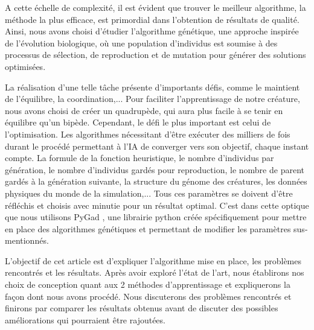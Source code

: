 \documentclass[journal, a4paper]{IEEEtran}
\begin{document}
A cette échelle de complexité, il est évident que trouver le meilleur algorithme, la méthode la plus efficace, est primordial dans l'obtention de résultats de qualité. Ainsi, nous avons choisi d'étudier l'algorithme génétique, une approche inspirée de l'évolution biologique, où une population d'individus est soumise à des processus de sélection, de reproduction et de mutation pour générer des solutions optimisées.

La réalisation d'une telle tâche présente d'importants défis, comme le maintient de l'équilibre, la coordination,... Pour faciliter l'apprentissage de notre créature, nous avons choisi de créer un quadrupède, qui aura plus facile à se tenir en équilibre qu'un bipède.
Cependant, le défi le plus important est celui de l'optimisation. Les algorithmes nécessitant d'être exécuter des milliers de fois durant le procédé permettant à l'IA de converger vers son objectif, chaque instant compte. La formule de la fonction heuristique, le nombre d'individus par génération, le nombre d'individus gardés pour reproduction, le nombre de parent gardés à la génération suivante, la structure du génome des créatures, les données physiques du monde de la simulation,... Tous ces paramètres se doivent d'être réfléchis et choisis avec minutie pour un résultat optimal. C'est dans cette optique que nous utilisons PyGad \cite{PyGad}, une librairie python créée spécifiquement pour mettre en place des algorithmes génétiques et permettant de modifier les paramètres sus-mentionnés.

L'objectif de cet article est d'expliquer l'algorithme mise en place, les problèmes rencontrés et les résultats. Après avoir exploré l'état de l'art, nous établirons nos choix de conception quant aux 2 méthodes d'apprentissage et expliquerons la façon dont nous avons procédé. Nous discuterons des problèmes rencontrés et finirons par comparer les résultats obtenus avant de discuter des possibles améliorations qui pourraient être rajoutées.


\end{document}
